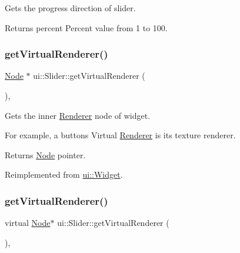 Gets the progress direction of slider.

\begin{DoxyReturn}{Returns}
percent Percent value from 1 to 100. 
\end{DoxyReturn}
\mbox{\label{classui_1_1Slider_a801fd6363b412ecc766abe2eea7924b6}} 
\subsubsection{\texorpdfstring{get\+Virtual\+Renderer()}{getVirtualRenderer()}\hspace{0.1cm}{\footnotesize\ttfamily [1/2]}}
{\footnotesize\ttfamily \hyperlink{classNode}{Node} $\ast$ ui\+::\+Slider\+::get\+Virtual\+Renderer (\begin{DoxyParamCaption}{ }\end{DoxyParamCaption})\hspace{0.3cm}{\ttfamily [override]}, {\ttfamily [virtual]}}

Gets the inner \hyperlink{classRenderer}{Renderer} node of widget.

For example, a button\textquotesingle{}s Virtual \hyperlink{classRenderer}{Renderer} is it\textquotesingle{}s texture renderer.

\begin{DoxyReturn}{Returns}
\hyperlink{classNode}{Node} pointer. 
\end{DoxyReturn}


Reimplemented from \hyperlink{classui_1_1Widget_acf862bf9235fbb3823819eeb65d46f25}{ui\+::\+Widget}.

\mbox{\label{classui_1_1Slider_a72c8715bd62b7eda0e733c66e008c712}} 
\subsubsection{\texorpdfstring{get\+Virtual\+Renderer()}{getVirtualRenderer()}\hspace{0.1cm}{\footnotesize\ttfamily [2/2]}}
{\footnotesize\ttfamily virtual \hyperlink{classNode}{Node}$\ast$ ui\+::\+Slider\+::get\+Virtual\+Renderer (\begin{DoxyParamCaption}{ }\end{DoxyParamCaption})\hspace{0.3cm}{\ttfamily [override]}, {\ttfamily [virtual]}}

